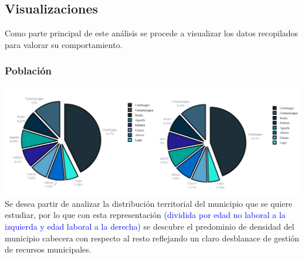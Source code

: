 \documentclass{article}
\begin{document}
\subsection{Visualizaciones}
Como parte principal de este análisis se procede a visualizar los datos recopilados para valorar su comportamiento.

\subsubsection{Población}
\includegraphics[width=1.0\textwidth]{img/fig1.png}
Se desea partir de analizar la distribución territorial del municipio que se quiere estudiar, por lo que con esta representación \textcolor{blue}{(dividida por edad no laboral a la izquierda y edad laboral a la derecha)} se descubre el predominio de densidad del municipio cabecera con respecto al resto reflejando un claro desblanace de gestión de recursos municipales.
\end{document}
